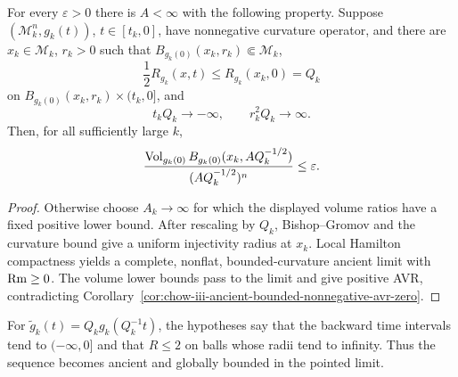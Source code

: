 \begin{proposition}
\label{prop:chow-iii-almost-ancient-large-scale-collapse}


For every $\varepsilon>0$ there is $A<\infty$ with the following property.
Suppose $(\mathcal M_k^n,g_k(t))$, $t\in[t_k,0]$, have nonnegative curvature
operator, and there are $x_k\in\mathcal M_k$, $r_k>0$ such that
$B_{g_k(0)}(x_k,r_k)\Subset\mathcal M_k$,
\[
 \frac12R_{g_k}(x,t)\le R_{g_k}(x_k,0)=Q_k
\]
on $B_{g_k(0)}(x_k,r_k)\times(t_k,0]$, and
\[
 t_kQ_k\longrightarrow-\infty,
 \qquad r_k^2Q_k\longrightarrow\infty.
\]
Then, for all sufficiently large $k$,
\[
 \frac{\operatorname{Vol}_{g_k(0)}B_{g_k(0)}(x_k,AQ_k^{-1/2})}
 {(AQ_k^{-1/2})^n}\le\varepsilon.
\]
\end{proposition}
\begin{proof}
\sketch Otherwise choose $A_k\to\infty$ for which the displayed volume ratios have a
fixed positive lower bound.  After rescaling by $Q_k$, Bishop--Gromov and the
curvature bound give a uniform injectivity radius at $x_k$.  Local Hamilton
compactness yields a complete, nonflat, bounded-curvature ancient limit with
$\operatorname{Rm}\ge0$.  The volume lower bounds pass to the limit and give positive AVR,
contradicting Corollary~\ref{cor:chow-iii-ancient-bounded-nonnegative-avr-zero}.
\end{proof}

\begin{remark}
\label{rem:chow-iii-almost-ancient-rescaling}


For $\widetilde g_k(t)=Q_kg_k(Q_k^{-1}t)$, the hypotheses say that the
backward time intervals tend to $(-\infty,0]$ and that $R\le2$ on balls whose
radii tend to infinity.  Thus the sequence becomes ancient and globally
bounded in the pointed limit.
\end{remark}

